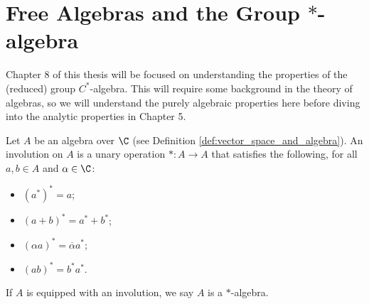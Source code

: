 \section{Free Algebras and the Group $\ast$-algebra}%
Chapter 8 of this thesis will be focused on understanding the properties of the (reduced) group $C^{\ast}$-algebra. This will require some background in the theory of algebras, so we will understand the purely algebraic properties here before diving into the analytic properties in Chapter 5.
\begin{definition}
  Let $A$ be an algebra over $\C$ (see Definition \ref{def:vector_space_and_algebra}). An involution on $A$ is a unary operation $\ast\colon A\rightarrow A$ that satisfies the following, for all $a,b\in A$ and $\alpha\in\C$:
  \begin{itemize}
    \item $\left(a^{\ast}\right)^{\ast} = a$;
    \item $\left(a+b\right)^{\ast} = a^{\ast} + b^{\ast}$;
    \item $\left(\alpha a\right)^{\ast} = \overline{\alpha} a^{\ast}$;
    \item $\left(ab\right)^{\ast} = b^{\ast}a^{\ast}$.
  \end{itemize}
  If $A$ is equipped with an involution, we say $A$ is a $\ast$-algebra.
\end{definition}
